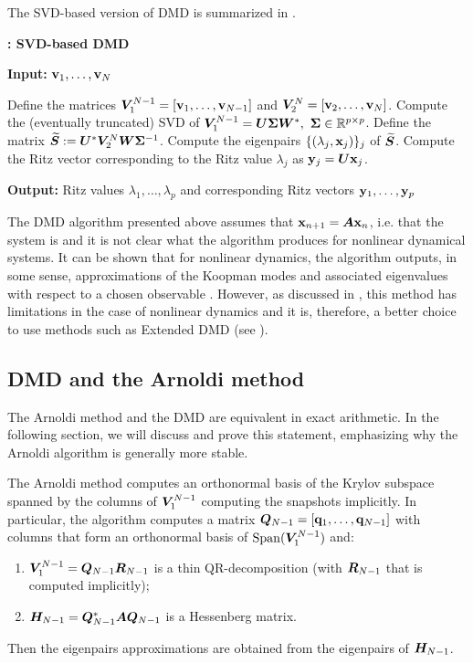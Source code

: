 The SVD-based version of DMD is summarized in .

\begin{algorithm}
\caption{\textbf{: SVD-based DMD}}
\label{alg_dmd}
\textbf{Input:} $\vb{v}_1,\dots, \vb{v}_N$
\begin{algorithmic}[1]
\State Define the matrices $\vb*{V}_1^{N-1} = \left[\vb{v}_1,\dots,\vb{v}_{N-1}\right]$ and $\vb*{V}_2^{N} = \left[\vb{v}_2,\dots,\vb{v}_{N}\right]$.
\State Compute the (eventually truncated) SVD of $\vb*{V}_1^{N-1} = \vb*{U}\vb*{\Sigma}\vb*{W}^*,\,\, \vb*{\Sigma}\in\mathbb{R}^{p\times p}$.
\State Define the matrix $\widetilde{\vb*{S}} := \vb*{U}^*\vb*{V}_2^N\vb*{W}\vb*{\Sigma}^{-1}$.
\State Compute the eigenpairs $\{(\lambda_j, \vb{x}_j)\}_j$ of $\widetilde{\vb*{S}}$.
\State Compute the Ritz vector corresponding to the Ritz value $\lambda_j$ as $\vb{y}_j = \vb*{U}\vb{x}_j$. 
\end{algorithmic}
\textbf{Output:} Ritz values $\lambda_1,\dots,\lambda_{p}$ and corresponding Ritz vectors $\vb{y}_1,\dots, \vb{y}_p$
\end{algorithm}

The DMD algorithm presented above assumes that $\vb{x}_{n+1} = \vb*{A}\vb{x}_n$, i.e. that the system is and it is not clear what the algorithm produces for nonlinear dynamical systems. It can be shown that for nonlinear dynamics, the algorithm outputs, in some sense, approximations of the Koopman modes and associated eigenvalues with respect to a chosen observable \cite{rowley_spectral_2009, tu_dynamic_2014}. However, as discussed in \cite{tu_dynamic_2014}, this method has limitations in the case of nonlinear dynamics and it is, therefore, a better choice to use methods such as Extended DMD \cite{williams_data-driven_2015} (see ).


\subsection{DMD and the Arnoldi method}
\label{section_dmd_arnoldi}
The Arnoldi method and the DMD are equivalent in exact arithmetic. In the following section, we will discuss and prove this statement, emphasizing why the Arnoldi algorithm is generally more stable.

The Arnoldi method computes an orthonormal basis of the Krylov subspace spanned by the columns of $\vb*{V}_1^{N-1}$ computing the snapshots implicitly. In particular, the algorithm computes a matrix $\vb*{Q}_{N-1} = \left[\vb{q}_1,\dots, \vb{q}_{N-1}\right]$ with columns that form an orthonormal basis of $\mathrm{Span}{(\vb*{V}_1^{N-1})}$ and: 
\begin{enumerate}[label=(\roman*)]
    \item $\vb*{V}_1^{N-1} = \vb*{Q}_{N-1} \vb*{R}_{N-1}$ is a thin QR-decomposition (with $\vb*{R}_{N-1}$ that is computed implicitly);
    \item $\vb*{H}_{N-1} = \vb*{Q}_{N-1}^* \vb*{A} \vb*{Q}_{N-1}$ is a Hessenberg matrix.
\end{enumerate}
Then the eigenpairs approximations are obtained from the eigenpairs of $\vb*{H}_{N-1}$.

